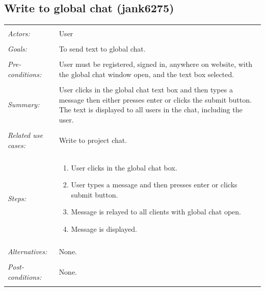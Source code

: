 \documentclass[11pt]{report}
\begin{document}
\begin{IDE-like Features}
\begin{}
\begin{Collaborative features that would be "nice":}
\subsection{Write to global chat (jank6275)}
\begin{tabular}{ p{2cm} p{12cm} }
 \hline
 \\
 \textit{Actors:} & User \\ 
 \\
 \textit{Goals:} & To send text to global chat. \\
 \\
 \textit{Pre-conditions:} & User must be registered, signed in, anywhere on website, with the global chat window open, and the text box selected.  \\
 \\
 \textit{Summary:} & User clicks in the global chat text box and then types a message then either presses enter or clicks the submit button. The text is displayed to all users in the chat, including the user. \\ 
 \\
 \textit{Related use cases:} & Write to project chat. \\ 
 \\
 \textit{Steps:} & \begin{enumerate}
  \item User clicks in the global chat box.
  \item User types a message and then presses enter or clicks submit button.
  \item Message is relayed to all clients with global chat open.
  \item Message is displayed.
 \end{enumerate} \\
 \\
 \textit{Alternatives:} & None. \\
 \\
 \textit{Post-conditions:} & None. \\
 \\
\hline
\end{tabular}


\end{Collaborative features that would be "nice":}
\end{}
\end{IDE-like Features}
\end{document}
